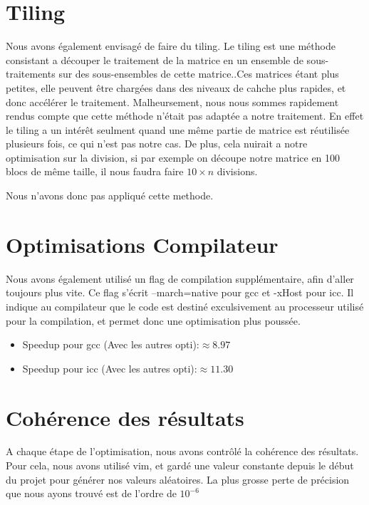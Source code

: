 \section*{Tiling}
Nous avons également envisagé de faire du tiling. Le tiling est une méthode consistant a découper le traitement de la matrice en un ensemble de sous-traitements sur des sous-ensembles de cette matrice..Ces matrices étant plus petites, elle peuvent être chargées dans des niveaux de cahche plus rapides, et donc accélérer le traitement.
Malheursement, nous nous sommes rapidement rendus compte que cette méthode n'était pas adaptée a notre traitement.
En effet le tiling a un intérêt seulment quand une même partie de matrice est réutilisée plusieurs fois, ce qui n'est pas notre cas.
De plus, cela nuirait a notre optimisation sur la division, si par exemple on découpe notre matrice en 100 blocs de même taille, il nous faudra faire $10\times n $ divisions.

Nous n'avons donc pas appliqué cette methode.

\section*{Optimisations Compilateur}

Nous avons également utilisé un flag de compilation supplémentaire, afin d'aller toujours plus vite.
Ce flag s'écrit --march=native pour gcc et -xHost pour icc. Il indique au compilateur que le code est destiné exculsivement au processeur utilisé pour la compilation, et permet donc une optimisation plus poussée.\\
\begin{itemize}
    \item{Speedup pour gcc (Avec les autres opti):$\approx 8.97$}
    \item{Speedup pour icc (Avec les autres opti):$\approx 11.30$}\\
\end{itemize}

\section*{Cohérence des résultats}

A chaque étape de l'optimisation, nous avons contrôlé la cohérence des résultats. Pour cela, nous avons utilisé vim, et gardé une valeur constante depuis le début du projet pour générer nos valeurs aléatoires. La plus grosse perte de précision que nous ayons trouvé est de l'ordre de $10^{-6}$


